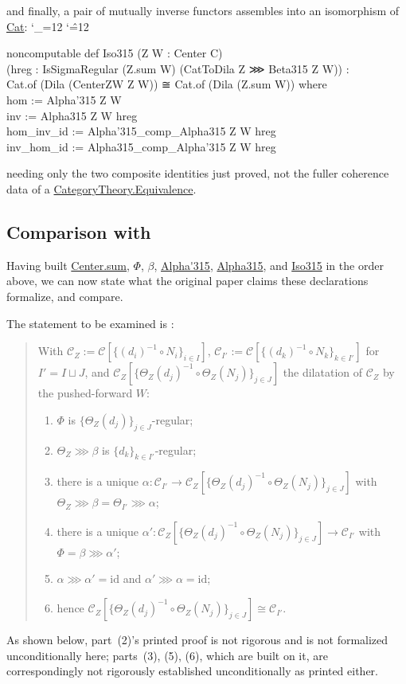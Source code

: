 \documentclass[11pt]{amsart}
\newcommand{\lc}[1]{\url{#1}}
\newenvironment{leancode}{%
  \begingroup
  \catcode`\_=12\relax
  \catcode`\^=12\relax
  \small\ttfamily\raggedright\baselineskip=1.15\baselineskip
  \par\smallskip\noindent
}{%
  \par\smallskip
  \endgroup
}
\theoremstyle{plain}
\theoremstyle{definition}
\theoremstyle{remark}
\newcommand{\calC}{\mathcal C}
\newcommand{\id}{\mathrm{id}}
\begin{document}
and finally, a pair of mutually inverse functors assembles into an isomorphism of \lc{Cat}:
\begin{leancode}
noncomputable def Iso315 (Z W : Center C) \\
    (hreg : IsSigmaRegular (Z.sum W) (CatToDila Z ⋙ Beta315 Z W)) : \\
    Cat.of (Dila (CenterZW Z W)) ≅ Cat.of (Dila (Z.sum W)) where \\
  hom := Alpha'315 Z W \\
  inv := Alpha315 Z W hreg \\
  hom_inv_id := Alpha'315_comp_Alpha315 Z W hreg \\
  inv_hom_id := Alpha315_comp_Alpha'315 Z W hreg \\
\end{leancode}
needing only the two composite identities just proved, not the fuller coherence data of a
\lc{CategoryTheory.Equivalence}.

\subsection{Comparison with \citep[Proposition~3.15]{Mayeux}}
\label{sec:gap}

Having built \lc{Center.sum}, $\Phi$, $\beta$, \lc{Alpha'315}, \lc{Alpha315}, and
\lc{Iso315} in the order above, we can now state what the original paper claims these
declarations formalize, and compare.

The statement to be examined is \citep[Proposition~3.15]{Mayeux}:
\begin{quote}
With $\calC_Z := \calC[\{(d_i)^{-1}\circ N_i\}_{i\in I}]$,
$\calC_{I'} := \calC[\{(d_k)^{-1}\circ N_k\}_{k\in I'}]$ for $I' = I\sqcup J$, and
$\calC_Z[\{\Theta_Z(d_j)^{-1}\circ\Theta_Z(N_j)\}_{j\in J}]$ the dilatation of $\calC_Z$ by the
pushed-forward $W$:
\begin{enumerate}
\item[(1)] $\Phi$ is $\{\Theta_Z(d_j)\}_{j\in J}$-regular;
\item[(2)] $\Theta_Z \ggg \beta$ is $\{d_k\}_{k\in I'}$-regular;
\item[(3)] there is a unique $\alpha : \calC_{I'} \to \calC_Z[\{\Theta_Z(d_j)^{-1}\circ
  \Theta_Z(N_j)\}_{j\in J}]$ with $\Theta_Z \ggg \beta = \Theta_{I'} \ggg \alpha$;
\item[(4)] there is a unique
  $\alpha' : \calC_Z[\{\Theta_Z(d_j)^{-1}\circ \Theta_Z(N_j)\}_{j\in J}] \to \calC_{I'}$ with
  $\Phi = \beta \ggg \alpha'$;
\item[(5)] $\alpha \ggg \alpha' = \id$ and $\alpha' \ggg \alpha = \id$;
\item[(6)] hence $\calC_Z[\{\Theta_Z(d_j)^{-1}\circ \Theta_Z(N_j)\}_{j\in J}] \cong \calC_{I'}$.
\end{enumerate}
\end{quote}
As shown below, part~(2)'s printed proof is not rigorous and is not formalized
unconditionally here; parts~(3), (5), (6), which are built on it, are correspondingly not
rigorously established unconditionally as printed either.
\end{document}

